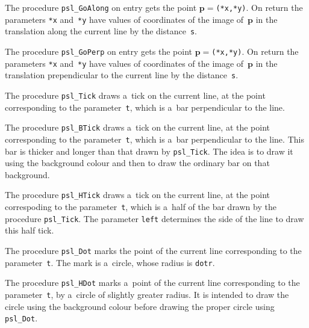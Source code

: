 \vspace{\bigskipamount}
The procedure \texttt{psl\_GoAlong} on entry gets the point
$\bm{p}=$\texttt{(*x,*y)}. On return the parameters \texttt{*x}
and~\texttt{*y} have values of coordinates of the image of~$\bm{p}$
in the translation along the current line by the distance~\texttt{s}.

\vspace{\bigskipamount}
The procedure \texttt{psl\_GoPerp} on entry gets the point
$\bm{p}=$\texttt{(*x,*y)}. On return the parameters \texttt{*x}
and~\texttt{*y} have values of coordinates of the image of~$\bm{p}$
in the translation prependicular to the current line by the
distance~\texttt{s}.

\vspace{\bigskipamount}
The procedure \texttt{psl\_Tick} draws a~tick on the current line, at the
point corresponding to the parameter~\texttt{t}, which is a~bar perpendicular
to the line.

\vspace{\bigskipamount}
The procedure \texttt{psl\_BTick} draws a~tick on the current line, at the
point corresponding to the parameter~\texttt{t}, which is a~bar perpendicular
to the line. This bar is thicker and longer than that drawn by
\texttt{psl\_Tick}. The idea is to draw it using the background colour
and then to draw the ordinary bar on that background.

\vspace{\bigskipamount}
The procedure \texttt{psl\_HTick} draws a~tick on the current line, at the
point correspoding to the parameter~\texttt{t}, which is a~half of the bar
drawn by the procedure \texttt{psl\_Tick}. The parameter \texttt{left}
determines the side of the line to draw this half tick.

\vspace{\bigskipamount}
The procedure \texttt{psl\_Dot} marks the point of the current line corresponding
to the parameter~\texttt{t}. The mark is a~circle, whose radius is
\texttt{dotr}.

\vspace{\bigskipamount}
The procedure \texttt{psl\_HDot} marks a~point of the current line
corresponding to the parameter~\texttt{t}, by a~circle of slightly greater
radius. It is intended to draw the circle using the background colour
before drawing the proper circle using \texttt{psl\_Dot}.

